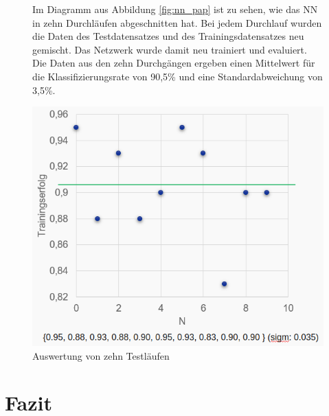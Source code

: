 \documentclass[12pt,toc=bib,toc=listof]{scrreprt}
\begin{document}
\begin{figure}[h]
\begin{minipage}[t]{.48\linewidth}

Im Diagramm aus Abbildung \ref{fig:nn_pap} ist zu sehen, wie das NN in zehn Durchläufen abgeschnitten hat. Bei jedem Durchlauf wurden die Daten des Testdatensatzes und des Trainingsdatensatzes neu gemischt. Das Netzwerk wurde damit neu trainiert und evaluiert. Die Daten aus den zehn Durchgängen ergeben einen Mittelwert für die Klassifizierungsrate von 90,5\% und eine Standardabweichung von 3,5\%.  
\end{minipage}
\hfill
\begin{minipage}[t]{.47\linewidth}
\strut\vspace*{-\baselineskip}
\newline
  \includegraphics[width=\linewidth]{./../bilder/auswertung}
  \caption{Auswertung von zehn Testläufen}
  \label{fig:nn_ausw}
\end{minipage}
\end{figure}

\chapter{Fazit} %
\label{sec:fazit}
\end{document}
